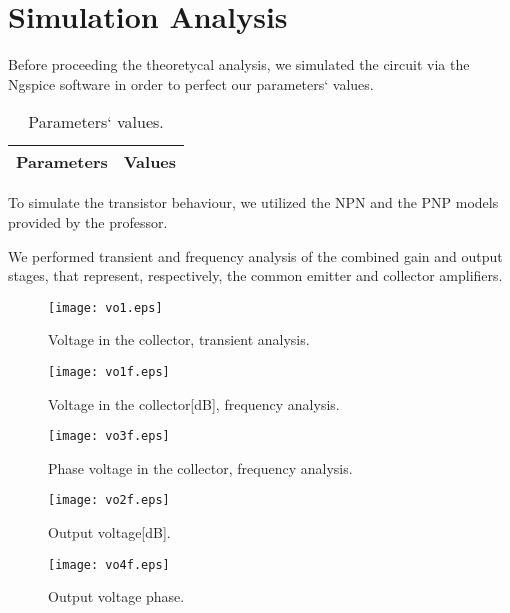 \section{Simulation Analysis}
\label{sec:simulation}

Before proceeding the theoretycal analysis, we simulated the circuit via the Ngspice software in order to perfect our parameters` values.

\begin{table}[h]
  \centering
  \begin{tabular}{|l|r|}
    \hline    
    {\bf Parameters} & {\bf Values} \\ \hline
    
  \end{tabular}
  \caption{Parameters` values.}
  \label{tab:s01}
\end{table}

To simulate the transistor behaviour, we utilized the NPN and the PNP models provided by the professor.

We performed transient and frequency analysis of the combined gain and output stages, that represent, respectively, the common emitter and collector amplifiers.

\begin{figure}[h] \centering
\texttt{[image: vo1.eps]}
\caption{Voltage in the collector, transient analysis.}
\label{fig:s1}
\end{figure}


\begin{figure}[h] \centering
\texttt{[image: vo1f.eps]}
\caption{Voltage in the collector[dB], frequency analysis.}
\label{fig:s2}
\end{figure}



\begin{figure}[h] \centering
\texttt{[image: vo3f.eps]}
\caption{Phase voltage in the collector, frequency analysis.}
\label{fig:s3}
\end{figure}

\vspace{10.0cm}


\begin{figure}[h] \centering
\texttt{[image: vo2f.eps]}
\caption{Output voltage[dB].}
\label{fig:s4}
\end{figure}

\vspace{10.0cm}

\begin{figure}[h] \centering
\texttt{[image: vo4f.eps]}
\caption{Output voltage phase.}
\label{fig:s5}
\end{figure}

